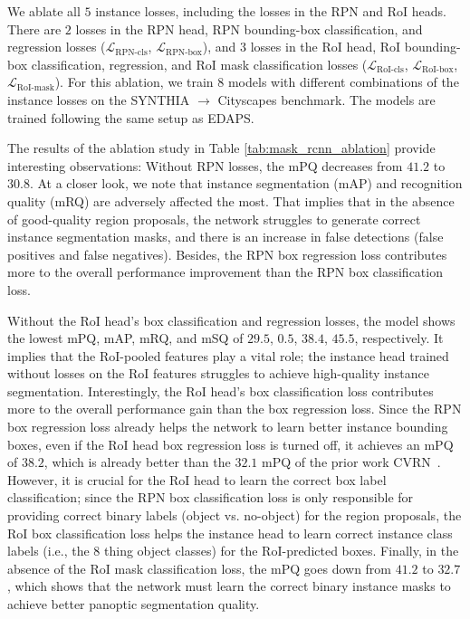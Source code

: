 \documentclass[10pt,twocolumn,letterpaper]{article}
\begin{document}
We ablate all $5$ instance losses, including the losses in the RPN and RoI heads.
There are $2$ losses in the RPN head, RPN bounding-box classification, and regression losses ($\mathcal{L}_\mathrm{RPN\text{-}cls}$, $\mathcal{L}_\mathrm{RPN\text{-}box}$),
and $3$ losses in the RoI head, RoI bounding-box classification, regression, and RoI mask classification losses ($\mathcal{L}_\mathrm{RoI\text{-}cls}$, 
$\mathcal{L}_\mathrm{RoI\text{-}box}$, $\mathcal{L}_\mathrm{RoI\text{-}mask}$).
For this ablation, we train $8$ models with different combinations of the instance losses on the SYNTHIA $\rightarrow$ Cityscapes benchmark.
The models are trained following the same setup as EDAPS.

The results of the ablation study in Table \ref{tab:mask_rcnn_ablation} provide interesting observations:
Without RPN losses, the mPQ decreases from $41.2$ to $30.8$.
At a closer look, we note that instance segmentation (mAP) and recognition quality (mRQ) are adversely affected the most.
That implies that in the absence of good-quality region proposals, the network struggles to generate correct instance segmentation masks, and there is an increase in false detections (false positives and false negatives).
Besides, the RPN box regression loss contributes more to the overall performance improvement than the RPN box classification loss. 

Without the RoI head's box classification and regression losses,
the model shows the lowest mPQ, mAP, mRQ, and mSQ of $29.5$, $0.5$, $38.4$, $45.5$, respectively.
It implies that the RoI-pooled features play a vital role; the instance head trained without losses on the RoI features struggles to achieve high-quality instance segmentation.
Interestingly, the RoI head's box classification loss contributes more to the overall performance gain than the box regression loss.
Since the RPN box regression loss already helps the network to learn better instance bounding boxes, even if the RoI head box regression loss is turned off, it achieves an mPQ of $38.2$, which is already better than the $32.1$ mPQ of the prior work CVRN~\cite{huang2021cross}.
However, it is crucial for the RoI head to learn the correct box label classification; since the RPN box classification loss is only responsible for providing correct binary labels (object vs. no-object) for the region proposals, the RoI box classification loss helps the instance head to learn correct instance class labels (i.e., the $8$ thing object classes) for the RoI-predicted boxes.
Finally, in the absence of the RoI mask classification loss, the mPQ goes down from $41.2$ to  $32.7$, which shows that the network must learn the correct binary instance masks to achieve better panoptic segmentation quality.
\end{document}
